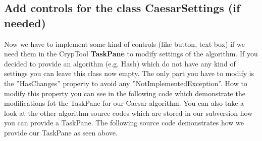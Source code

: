 \subsection{Add controls for the class CaesarSettings (if needed)}\label{sec:AddControlsForTheClassCaesarSettingsIfNeeded}
Now we have to implement some kind of controls (like button, text box) if we need them in the CrypTool \textbf{TaskPane} to modify settings of the algorithm. If you decided to provide an algorithm (e.g. Hash) which do not have any kind of settings you can leave this class now empty. The only part you have to modify is the ''HasChanges'' property to avoid any ''NotImplementedException''. How to modify this property you can see in the following code which demonstrate the modifications fot the TaskPane for our Caesar algorithm. You can also take a look at the other algorithm source codes which are stored in our subversion how you can provide a TaskPane. The following source code demonstrates how we provide our TaskPane as seen above.
